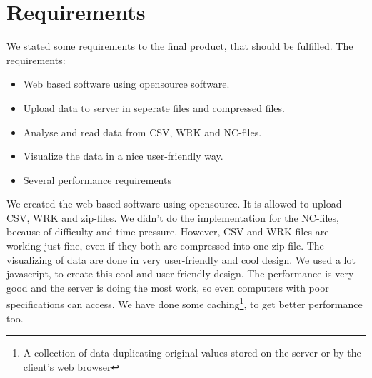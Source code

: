 \chapter{Requirements}
We stated some requirements to the final product, that should be fulfilled. 
The requirements:
\begin{itemize}
\item Web based software using opensource software.
\item Upload data to server in seperate files and compressed files.
\item Analyse and read data from CSV, WRK and NC-files.
\item Visualize the data in a nice user-friendly way.
\item Several performance requirements
\end{itemize}
We created the web based software using opensource.
It is allowed to upload CSV, WRK and zip-files.
We didn't do the implementation for the NC-files, because of difficulty and time pressure. However, CSV and WRK-files are working just fine, even if they both are compressed into one zip-file.
The visualizing of data are done in very user-friendly and cool design. We used a lot javascript, to create this cool and user-friendly design.
The performance is very good and the server is doing the most work, so even computers with poor specifications can access. We have done some caching\footnote{A collection of data duplicating original values stored on the server or by the client's web browser}, to get better performance too.